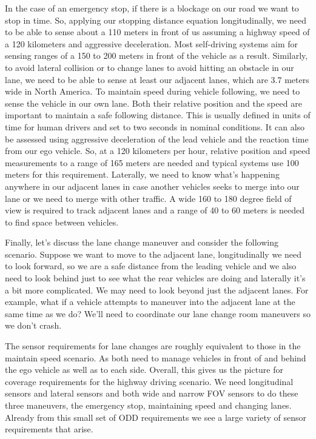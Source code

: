 In the case of an emergency stop, if there is a blockage on our road we want to stop in time. 
So, applying our stopping distance equation longitudinally, we need to be able to sense about a 110 meters in front of us assuming a highway speed of a 120 kilometers and aggressive deceleration. 
Most self-driving systems aim for sensing ranges of a 150 to 200 meters in front of the vehicle as a result. 
Similarly, to avoid lateral collision or to change lanes to avoid hitting an obstacle in our lane, we need to be able to sense at least our adjacent lanes, 
which are 3.7 meters wide in North America. To maintain speed during vehicle following, we need to sense the vehicle in our own lane. 
Both their relative position and the speed are important to maintain a safe following distance. 
This is usually defined in units of time for human drivers and set to two seconds in nominal conditions. 
It can also be assessed using aggressive deceleration of the lead vehicle and the reaction time from our ego vehicle. 
So, at a 120 kilometers per hour, relative position and speed measurements to a range of 165 meters are needed and typical systems use 100 meters for this requirement. 
Laterally, we need to know what's happening anywhere in our adjacent lanes in case another vehicles seeks to merge into our lane or we need to merge with other traffic. 
A wide 160 to 180 degree field of view is required to track adjacent lanes and a range of 40 to 60 meters is needed to find space between vehicles. 

Finally, let's discuss the lane change maneuver and consider the following scenario. 
Suppose we want to move to the adjacent lane, longitudinally we need to look forward, so we are a safe distance from the leading vehicle and 
we also need to look behind just to see what the rear vehicles are doing and laterally it's a bit more complicated. 
We may need to look beyond just the adjacent lanes. For example, what if a vehicle attempts to maneuver into the adjacent lane at the same time as we do? 
We'll need to coordinate our lane change room maneuvers so we don't crash. 

The sensor requirements for lane changes are roughly equivalent to those in the maintain speed scenario. 
As both need to manage vehicles in front of and behind the ego vehicle as well as to each side. 
Overall, this gives us the picture for coverage requirements for the highway driving scenario. 
We need longitudinal sensors and lateral sensors and both wide and narrow FOV sensors to do these three maneuvers, the emergency stop, maintaining speed and changing lanes. 
Already from this small set of ODD requirements we see a large variety of sensor requirements that arise. 


